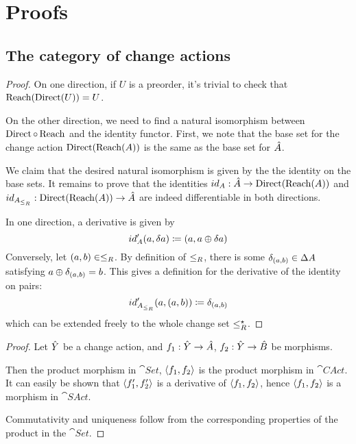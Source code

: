 \clearpage
\appendix
\appendixpage
\section{Proofs}

\subsection{The category of change actions}

\preordEquivalence*
\begin{proof}
  \label{prf:preordEquivalence}
  On one direction, if $U$ is a preorder, it's trivial to check that $\operatorname{Reach} (\operatorname{Direct} (U)) = U$.

  On the other direction, we need to find a natural isomorphism between $\operatorname{Direct} \circ \operatorname{Reach}$
  and the identity functor. First, we note that the base set for the change action
  $\operatorname{Direct}(\operatorname{Reach}(A))$ is the same as the base set for $\hat{A}$.

  We claim that the desired natural isomorphism is given by the
  the identity on the base sets. It remains to prove that the identities
  $id_A : \hat{A} \rightarrow \operatorname{Direct}(\operatorname{Reach}(A))$ and
  $id_{A_{\leq_R}} : \operatorname{Direct}(\operatorname{Reach}(A)) \rightarrow \hat{A}$
  are indeed differentiable in both directions.

  In one direction, a derivative is given by
  \begin{displaymath}
    id'_A(a, \delta a) \coloneqq (a, a \oplus \delta a)
  \end{displaymath}
  Conversely, let $(a, b) \in \leq_R$. By definition of $\leq_R$, there is some
  $\delta_{(a, b)} \in \Delta A$ satisfying $a \oplus \delta_{(a,b)} = b$.
  This gives a definition for the derivative of the identity on pairs:
  \begin{displaymath}
    id'_{A_{\leq_R}}(a, (a, b)) \coloneqq \delta_{(a, b)}
  \end{displaymath}
  which can be extended freely to the whole change set $\leq_R^\star$. 
\end{proof}

\products*
\begin{proof}
  \label{prf:products}
  Let $\hat{Y}$ be a change action, and $f_1: \hat{Y} \rightarrow \hat{A}$, $f_2: \hat{Y}
  \rightarrow \hat{B}$ be morphisms.

  Then the product morphism in $\cat{Set}$, $\left\langle {f_1}, {f_2} \right\rangle$ is the product
  morphism in $\cat{CAct}$. It can easily be
  shown that $\left\langle {f_1'}, {f_2'} \right\rangle$ is a derivative of $\left\langle {f_1}, {f_2} \right\rangle$,
  hence $\left\langle {f_1}, {f_2} \right\rangle$ is a morphism in $\cat{SAct}$.

  Commutativity and uniqueness follow from the corresponding properties of the
  product in the $\cat{Set}$.
\end{proof}

